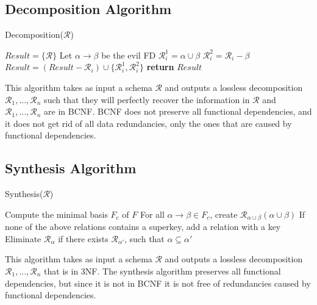 \subsection{Decomposition Algorithm}
\begin{algorithm}
\caption{Decomposition($\mathcal{R}$)}
\begin{algorithmic}
\State $Result = \{\mathcal{R}\}$
	\State Let $\alpha \to \beta$ be the evil FD
	\State $\mathcal{R}_i^1 = \alpha \cup \beta$
	\State $\mathcal{R}_i^2 = \mathcal{R}_i - \beta$
	\State $Result = (Result - \mathcal{R}_i) \cup \{\mathcal{R}_i^1, \mathcal{R}_i^2\}$
\EndWhile
\State \textbf{return} $Result$
\end{algorithmic}
\end{algorithm}
\newcommand{\R}{\mathcal{R}}
\noindent This algorithm takes as input a schema $\mathcal{R}$ and outputs a lossless decomposition $\mathcal{R}_1, ..., \R_n$ such that they will perfectly recover the information in $\R$ and $\R_1, ..., \R_n$ are in BCNF. BCNF does not preserve all functional dependencies, and it does not get rid of all data redundancies, only the ones that are caused by functional dependencies. 

\subsection{Synthesis Algorithm}
\begin{algorithm}
\caption{Synthesis($\R$)}
\begin{algorithmic}
\State Compute the minimal basis $F_c$ of $F$
\State For all $\alpha \to \beta \in F_c$, create $\R_{\alpha \cup \beta}(\alpha \cup \beta)$
\State If none of the above relations contains a superkey, add a relation with a key
\State Eliminate $\R_\alpha$ if there exists $\R_{\alpha'}$, such that $\alpha \subseteq \alpha'$
\end{algorithmic}
\end{algorithm}
\noindent This algorithm takes as input a schema $\R$ and outputs a lossless decomposition $\R_1, ..., \R_n$ that is in 3NF. The synthesis algorithm preserves all functional dependencies, but since it is not in BCNF it is not free of redundancies caused by functional dependencies.

